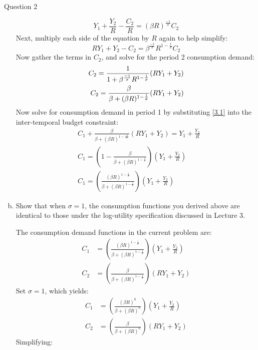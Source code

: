 \documentclass[a4paper]{article}
\begin{document}
\begin{questionbox}{Question 2}
\begin{enumerate}[(a)]
\begin{explanationbox}
				\[
					Y_1 + \frac{Y_2}{R} - \frac{C_2}{R} = (\beta R)^{\frac{-1}{\sigma}} C_2
				\]
				Next, multiply each side of the equation by \( R \) again to help simplify:
				\[
					R Y_1 + Y_2 - C_2 = \beta^{\frac{-1}{\sigma}} R^{1-\frac{1}{\sigma}} C_2
				\]
				Now gather the terms in \( C_2 \), and solve for the period 2 consumption demand:
				\begin{align}
					C_2 = \frac{1}{1 + \beta^{\frac{-1}{\sigma}}R^{1-\frac{1}{\sigma}}} (RY_1 + Y_2) \notag\\
					C_2 = \frac{\beta}{\beta + (\beta R)^{1 - \frac{1}{\sigma}}} (RY_1 + Y_2) \label{3.1}
				\end{align}
				Now solve for consumption demand in period 1 by substituting \cref{3.1} into the inter-temporal budget constraint:
				\begin{align*}
					&C_1 + \frac{\beta}{\beta + (\beta R)^{1 - \frac{-1}{\sigma}}} (RY_1 + Y_2) = Y_1 + \frac{Y_2}{R}\\
					&C_1 = \left( 1 - \frac{\beta}{\beta + (\beta R)^{1 - \frac{1}{\sigma}}} \right) \left( Y_1 +\frac{Y_2}{R} \right)\\
					&C_1 = \left( \frac{(\beta R)^{1 - \frac{1}{\sigma}}}{\beta + (\beta R)^{1 - \frac{1}{\sigma}}} \right) \left( Y_1 +\frac{Y_2}{R} \right)
				\end{align*}
			\end{explanationbox}
			\item Show that when \( \sigma = 1 \), the consumption functions you derived above are identical to those under the log-utility specification discussed in Lecture 3.
			\begin{explanationbox}
				The consumption demand functions in the current problem are:
				\begin{align*}
					C_1 &= \left( \frac{(\beta R)^{1 - \frac{1}{\sigma}}}{\beta + (\beta R)^{1 - \frac{1}{\sigma}}} \right) \left( Y_1 +\frac{Y_2}{R} \right)\\
					C_2 &= \left( \frac{\beta}{\beta + (\beta R)^{1 - \frac{1}{\sigma}}} \right) \left( RY_1 + Y_2 \right)
				\end{align*}
				Set \( \sigma = 1 \), which yields:
				\begin{align*}
					C_1 &= \left( \frac{(\beta R)^0}{\beta + (\beta R)^0} \right) \left( Y_1 +\frac{Y_2}{R} \right)\\
					C_2 &= \left( \frac{\beta}{\beta + (\beta R)^0} \right) \left( RY_1 + Y_2 \right)
				\end{align*}
				Simplifying:
				\begin{align*}

\end{align*}
\end{explanationbox}
\end{enumerate}
\end{questionbox}
\end{document}
